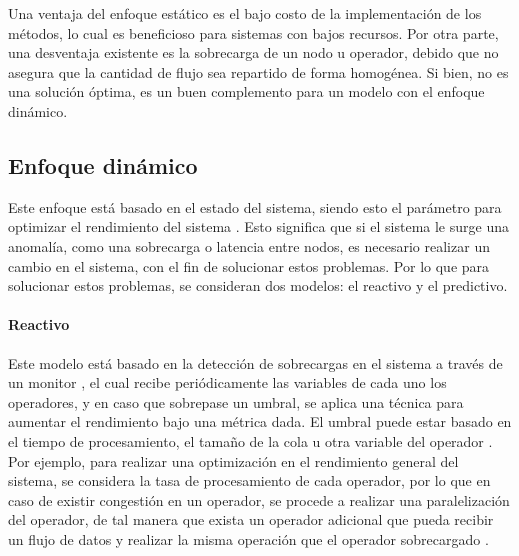 Una ventaja del enfoque estático es el bajo costo de la implementación de los métodos, lo cual es beneficioso para sistemas con bajos recursos. Por otra parte, una desventaja existente es la sobrecarga de un nodo u operador, debido que no asegura que la cantidad de flujo sea repartido de forma homogénea. Si bien, no es una solución óptima, es un buen complemento para un modelo con el enfoque dinámico.

\subsection{Enfoque dinámico}
\label{subsec:enfoqueDinamicoBC}


Este enfoque está basado en el estado del sistema, siendo esto el parámetro para optimizar el rendimiento del sistema \citep{CasavantK88}. Esto significa que si el sistema le surge una anomalía, como una sobrecarga o latencia entre nodos, es necesario realizar un cambio en el sistema, con el fin de solucionar estos problemas. Por lo que para solucionar estos problemas, se consideran dos modelos: el reactivo y el predictivo.

\paragraph{Reactivo}

Este modelo está basado en la detección de sobrecargas en el sistema a través de un monitor \citep{GulisanoJPSV12}, el cual recibe periódicamente las variables de cada uno los operadores, y en caso que sobrepase un umbral, se aplica una técnica para aumentar el rendimiento bajo una métrica dada. El umbral puede estar basado en el tiempo de procesamiento, el tamaño de la cola u otra variable del operador \citep{BhuvanagiriGKS06}. Por ejemplo, para realizar una optimización en el rendimiento general del sistema, se considera la tasa de procesamiento de cada operador, por lo que en caso de existir congestión en un operador, se procede a realizar una paralelización del operador, de tal manera que exista un operador adicional que pueda recibir un flujo de datos y realizar la misma operación que el operador sobrecargado \citep{SchneiderAGBW09}.

